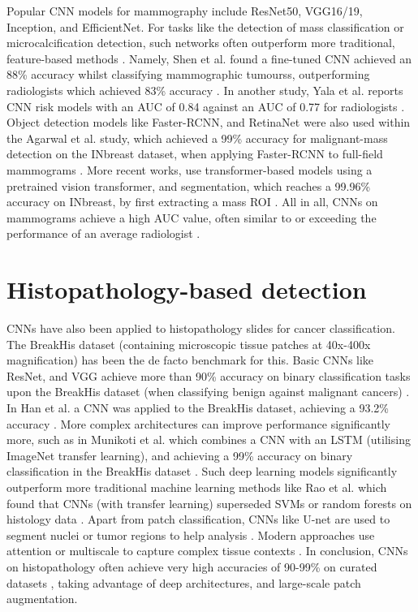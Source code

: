 \documentclass[../main]{subfiles}
\begin{document}
Popular CNN models for mammography include ResNet50, VGG16/19, Inception, and EfficientNet. For tasks like the detection of mass classification or microcalcification detection, such networks often outperform more traditional, feature-based methods \autocite{wang2024mammography} \autocite{carriero2024deep}. Namely, Shen et al. found a fine-tuned CNN achieved an 88\% accuracy whilst classifying mammographic tumourss, outperforming radiologists which achieved 83\% accuracy \autocite{wang2024mammography}. In another study, Yala et al. reports CNN risk models with an AUC of 0.84 against an AUC of 0.77 for radiologists \autocite{wang2024mammography}. Object detection models like Faster-RCNN, and RetinaNet were also used within the Agarwal et al. study, which achieved a 99\% accuracy for malignant-mass detection on the INbreast dataset, when applying Faster-RCNN to full-field mammograms \autocite{jiang2024deep}. More recent works, use transformer-based models using a pretrained vision transformer, and segmentation, which reaches a 99.96\% accuracy on INbreast, by first extracting a mass ROI \autocite{kumar2024segmentation}. All in all, CNNs on mammograms achieve a high AUC value, often similar to or exceeding the performance of an average radiologist \autocite{carriero2024deep}.

\section{Histopathology-based detection}
\label{sec:histopathology-cnn}
CNNs have also been applied to histopathology slides for cancer classification. The BreakHis dataset (containing microscopic tissue patches at 40x-400x magnification) has been the de facto benchmark for this. Basic CNNs like ResNet, and VGG achieve more than 90\% accuracy on binary classification tasks upon the BreakHis dataset (when classifying benign against malignant cancers) \autocite{jiang2024deep}. In Han et al. a CNN was applied to the BreakHis dataset, achieving a 93.2\% accuracy \autocite{jiang2024deep}. More complex architectures can improve performance significantly more, such as in Munikoti et al. which combines a CNN with an LSTM (utilising ImageNet transfer learning), and achieving a 99\% accuracy on binary classification in the BreakHis dataset \autocite{srikantamurthy2023classification}. Such deep learning models significantly outperform more traditional machine learning methods like Rao et al. which found that CNNs (with transfer learning) superseded SVMs or random forests on histology data \autocite{yusoff2023accuracy}. Apart from patch classification, CNNs like U-net are used to segment nuclei or tumor regions to help analysis \autocite{jiang2024deep}. Modern approaches use attention or multiscale to capture complex tissue contexts \autocite{srikantamurthy2023classification}. In conclusion, CNNs on histopathology often achieve very high accuracies of 90-99\% on curated datasets \autocite{srikantamurthy2023classification} \autocite{yusoff2023accuracy}, taking advantage of deep architectures, and large-scale patch augmentation.
\end{document}

